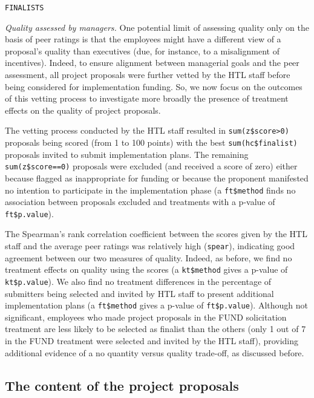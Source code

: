 \documentclass[11pt, titlepage]{article}
\begin{document}
\begin{verbatim}
FINALISTS 
\end{verbatim}

\emph{Quality assessed by managers.} One potential limit of assessing
quality only on the basis of peer ratings is that the employees might
have a different view of a proposal's quality than executives (due, for
instance, to a misalignment of incentives). Indeed, to ensure alignment
between managerial goals and the peer assessment, all project proposals
were further vetted by the HTL staff before being considered for
implementation funding. So, we now focus on the outcomes of this vetting
process to investigate more broadly the presence of treatment effects on
the quality of project proposals.

The vetting process conducted by the HTL staff resulted in
\texttt{sum(z\$score\textgreater{}0)} proposals being scored (from 1 to
100 points) with the best \texttt{sum(hc\$finalist)} proposals invited
to submit implementation plans. The remaining \texttt{sum(z\$score==0)}
proposals were excluded (and received a score of zero) either because
flagged as inappropriate for funding or because the proponent manifested
no intention to participate in the implementation phase (a
\texttt{ft\$method} finds no association between proposals excluded and
treatments with a p-value of \texttt{ft\$p.value}).

The Spearman's rank correlation coefficient between the scores given by
the HTL staff and the average peer ratings was relatively high
(\texttt{spear}), indicating good agreement between our two measures of
quality. Indeed, as before, we find no treatment effects on quality
using the scores (a \texttt{kt\$method} gives a p-value of
\texttt{kt\$p.value}). We also find no treatment differences in the
percentage of submitters being selected and invited by HTL staff to
present additional implementation plans (a \texttt{ft\$method} gives a
p-value of \texttt{ft\$p.value}). Although not significant, employees
who made project proposals in the FUND solicitation treatment are less
likely to be selected as finalist than the others (only 1 out of 7 in
the FUND treatment were selected and invited by the HTL staff),
providing additional evidence of a no quantity versus quality trade-off,
as discussed before.

\subsection{The content of the project
proposals}\label{the-content-of-the-project-proposals}
\end{document}
